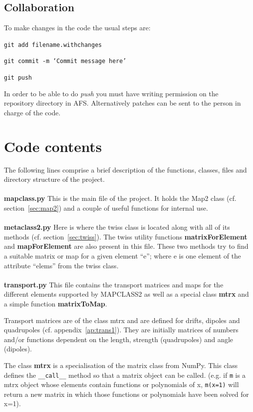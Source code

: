 \documentclass[a4paper]{cernatsnote}
\begin{document}
\subsection{Collaboration}
To make changes in the code the usual steps are:

\texttt{git add filename.withchanges}

\texttt{git commit -m `Commit message here'}

\texttt{git push}

In order to be able to do \textit{push} you must have writing
permission on the repository directory in AFS. Alternatively patches
can be sent to the person in charge of the code.

\section{Code contents}
\label{sec:code}
The following lines comprise a brief description of the functions, classes,
files and directory structure of the project.
\\\\
\textbf{mapclass.py}
This is the main file of the project. It holds the Map2 class
(cf. section~\ref{sec:map2}) and a couple of useful functions for
internal use.
\\\\
\textbf{metaclass2.py}
Here is where the twiss class is located along with all of its methods
(cf. section~\ref{sec:twiss}). The twiss utility functions
\textbf{matrixForElement} and \textbf{mapForElement} are also present
in this file. These two methods try to find a suitable matrix or map
for a given element ``e''; where e is one element of the attribute
``elems'' from the twiss class.
\\\\
\textbf{transport.py}
This file contains the transport matrices and maps for the different
elements supported by \textsc{MAPCLASS2} as well as a special class
\textbf{mtrx} and a simple function \mbox{\textbf{matrixToMap}}.

Transport matrices are of the class mtrx and are defined for drifts,
dipoles and quadrupoles (cf. appendix~\ref{ap:trans1}). They are
initially matrices of numbers and/or functions dependent on the length,
strength (quadrupoles) and angle (dipoles).

The class \textbf{mtrx} is a specialisation of the matrix class from
NumPy. This class defines the \texttt{\_\_call\_\_} method so that a
matrix object can be called. (e.g. if \texttt{m} is a mtrx object whose
elements contain functions or polynomials of x, \texttt{m(x=1)} will
return a new matrix in which those functions or polynomials have been
solved for x=1).
\end{document}
